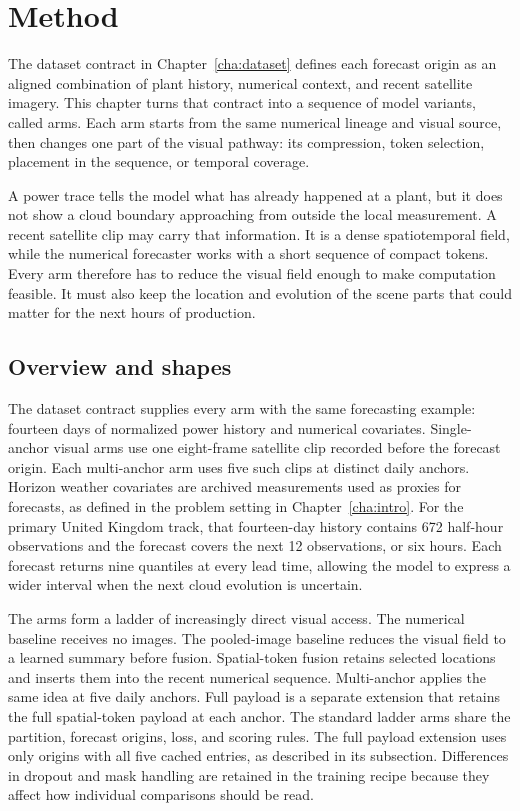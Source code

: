 \chapter{Method}
\label{cha:method}

The dataset contract in Chapter~\ref{cha:dataset} defines each forecast origin as an aligned combination of plant history, numerical context, and recent satellite imagery. This chapter turns that contract into a sequence of model variants, called arms. Each arm starts from the same numerical lineage and visual source, then changes one part of the visual pathway: its compression, token selection, placement in the sequence, or temporal coverage.

A power trace tells the model what has already happened at a plant, but it does not show a cloud boundary approaching from outside the local measurement. A recent satellite clip may carry that information. It is a dense spatiotemporal field, while the numerical forecaster works with a short sequence of compact tokens. Every arm therefore has to reduce the visual field enough to make computation feasible. It must also keep the location and evolution of the scene parts that could matter for the next hours of production.

\section{Overview and shapes}

The dataset contract supplies every arm with the same forecasting example: fourteen days of normalized power history and numerical covariates. Single-anchor visual arms use one eight-frame satellite clip recorded before the forecast origin. Each multi-anchor arm uses five such clips at distinct daily anchors. Horizon weather covariates are archived measurements used as proxies for forecasts, as defined in the problem setting in Chapter~\ref{cha:intro}. For the primary United Kingdom track, that fourteen-day history contains 672 half-hour observations and the forecast covers the next 12 observations, or six hours. Each forecast returns nine quantiles at every lead time, allowing the model to express a wider interval when the next cloud evolution is uncertain.

The arms form a ladder of increasingly direct visual access. The numerical baseline receives no images. The pooled-image baseline reduces the visual field to a learned summary before fusion. Spatial-token fusion retains selected locations and inserts them into the recent numerical sequence. Multi-anchor applies the same idea at five daily anchors. Full payload is a separate extension that retains the full spatial-token payload at each anchor. The standard ladder arms share the partition, forecast origins, loss, and scoring rules. The full payload extension uses only origins with all five cached entries, as described in its subsection. Differences in dropout and mask handling are retained in the training recipe because they affect how individual comparisons should be read.

